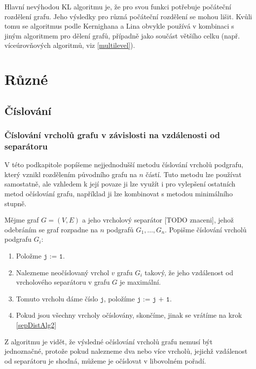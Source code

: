 \documentclass[11pt,american,czech,oneside]{book}
\theoremstyle{plain}
\theoremstyle{definition}
\begin{document}
Hlavní nevýhodou KL algoritmu je, že pro svou funkci potřebuje počáteční rozdělení grafu. Jeho výsledky pro různá počáteční rozdělení se mohou lišit. Kvůli tomu se algoritmus podle Kernighana a Lina obvykle používá v kombinaci s jiným algoritmem pro dělení grafů, případně jako součást většího celku (např. víceúrovňových algoritmů, viz \ref{multilevel}).



\chapter{Různé}
\section{Číslování}
\subsection{Číslování vrcholů grafu v závislosti na vzdálenosti od separátoru}
\label{sepDistNumbering}

    V této podkapitole popíšeme nejjednodušší metodu číslování vrcholů podgrafu, který vznikl rozdělením původního grafu na $n$ částí.
    Tuto metodu lze používat samostatně, ale vzhledem k její povaze ji lze využít i pro vylepšení ostatních metod očíslování grafu,
    například ji lze kombinovat s metodou minimálního stupně.

    Mějme graf $G = (V,E)$ a jeho vrcholový separátor [TODO znaceni], jehož odebráním se graf rozpadne na $n$ podgrafů $G_1, \ldots, G_n$.
    Popišme číslování vrcholů podgrafu $G_i$:

    \begin{enumerate}
      \item Položme $\texttt{j := 1}$.
      \item \label{sepDistAlg2} Nalezneme neočíslovaný vrchol $v$ grafu $G_i$ takový, že jeho vzdálenost od vrcholového separátoru v grafu $G$ je maximální.
      \item Tomuto vrcholu dáme číslo $\texttt{j}$, položíme $\texttt{j := j + 1}$.
      \item Pokud jsou všechny vrcholy očíslovány, skončíme, jinak se vrátíme na krok \ref{sepDistAlg2}
    \end{enumerate}

    Z algoritmu je vidět, že výsledné očíslování vrcholů grafu nemusí být jednoznačné, protože pokud nalezneme dva nebo více vrcholů, jejichž vzdálenost
    od separátoru je shodná, můžeme je očíslovat v libovolném pořadí.
\end{document}

